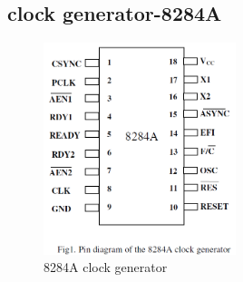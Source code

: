 \documentclass[12pt]{article}
\begin{document}
\subsection{clock generator-8284A}
\begin{figure}[H]
	\centering
	\captionsetup{justification=centering}
	\includegraphics[width = 0.5\textwidth]{image/8284A.png}
	\caption{
		8284A clock generator
	}
	\label{fig:fib}
	
\end{figure}
\end{document}
